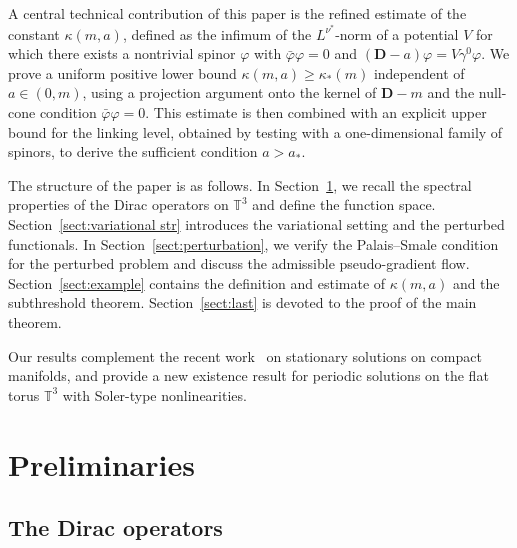 \documentclass[11pt,final]{amsart}
\newcommand{\T}{\mathbb{T}}
\newcommand{\pD}{\mathbf{D}}
\begin{document}
A central technical contribution of this paper is the refined estimate of the constant $\kappa(m,a)$, defined as the infimum of the $L^{\nu^*}$-norm of a potential $V$ for which there exists a nontrivial spinor $\varphi$ with $\bar\varphi\varphi=0$ and $(\pD-a)\varphi=V\gamma^0\varphi$. We prove a uniform positive lower bound $\kappa(m,a)\ge\kappa_*(m)$ independent of $a\in(0,m)$, using a projection argument onto the kernel of $\pD-m$ and the null-cone condition $\bar\varphi\varphi=0$. This estimate is then combined with an explicit upper bound for the linking level, obtained by testing with a one-dimensional family of spinors, to derive the sufficient condition $a>a_*$.

The structure of the paper is as follows. In Section~\ref{sec:prelim}, we recall the spectral properties of the Dirac operators on $\T^3$ and define the function space. Section~\ref{sect:variational str} introduces the variational setting and the perturbed functionals. In Section~\ref{sect:perturbation}, we verify the Palais--Smale condition for the perturbed problem and discuss the admissible pseudo-gradient flow. Section~\ref{sect:example} contains the definition and estimate of $\kappa(m,a)$ and the subthreshold theorem. Section~\ref{sect:last} is devoted to the proof of the main theorem.

Our results complement the recent work~\cite{WZ2026Stationary} on stationary solutions on compact manifolds, and provide a new existence result for periodic solutions on the flat torus $\T^3$ with Soler-type nonlinearities.



\section{Preliminaries}\label{sec:prelim}



\subsection{The Dirac operators}
\end{document}
